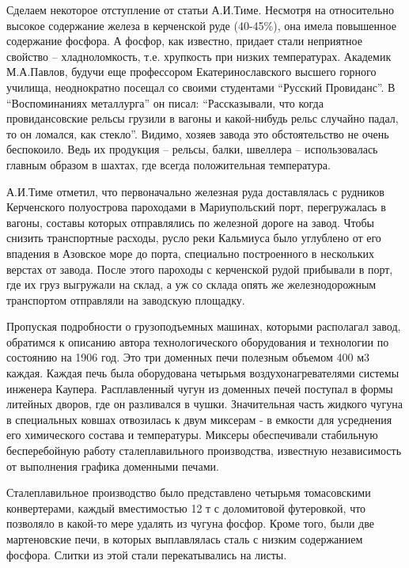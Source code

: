 
Сделаем некоторое отступление от статьи А.И.Тиме. Несмотря на относительно
высокое содержание железа в керченской руде (40-45\%), она имела  повышенное
содержание фосфора. А фосфор, как известно, придает стали неприятное свойство –
хладноломкость, т.е. хрупкость при низких температурах. Академик М.А.Павлов,
будучи еще профессором Екатеринославского высшего горного училища, неоднократно
посещал со своими студентами \enquote{Русский Провиданс}. В \enquote{Воспоминаниях металлурга}
он писал: \enquote{Рассказывали, что когда провидансовские рельсы грузили в вагоны и
какой-нибудь рельс случайно падал, то он ломался, как стекло}. Видимо, хозяев
завода это обстоятельство не очень беспокоило. Ведь их продукция – рельсы,
балки, швеллера – использовалась главным образом в шахтах, где всегда
положительная температура.

А.И.Тиме отметил, что первоначально железная руда доставлялась с рудников
Керченского полуострова пароходами в Мариупольский порт, перегружалась в
вагоны, составы которых отправлялись по железной дороге на завод. Чтобы снизить
транспортные расходы, русло реки Кальмиуса было углублено от его впадения в
Азовское море до порта, специально построенного в нескольких верстах от завода.
После этого пароходы с керченской рудой прибывали в порт, где их груз выгружали
на склад, а уж со склада опять же железнодорожным транспортом отправляли на
заводскую площадку.

Пропуская подробности о грузоподъемных машинах, которыми располагал завод,
обратимся к описанию автора технологического оборудования и технологии по
состоянию на 1906 год. Это три доменных печи полезным объемом 400 м3 каждая.
Каждая печь была оборудована четырьмя воздухонагревателями системы инженера
Каупера. Расплавленный чугун из доменных печей поступал в формы литейных
дворов, где он разливался в чушки. Значительная часть жидкого чугуна в
специальных ковшах отвозилась к двум миксерам - в емкости для усреднения его
химического состава и температуры. Миксеры обеспечивали стабильную
бесперебойную работу сталеплавильного производства, известную независимость от
выполнения графика доменными  печами.

Сталеплавильное производство было представлено четырьмя томасовскими
конвертерами, каждый вместимостью 12 т  с доломитовой футеровкой, что позволяло
в какой-то мере удалять из чугуна фосфор. Кроме того, были две мартеновские
печи, в которых выплавлялась сталь с низким содержанием фосфора. Слитки из этой
стали перекатывались на листы. 

